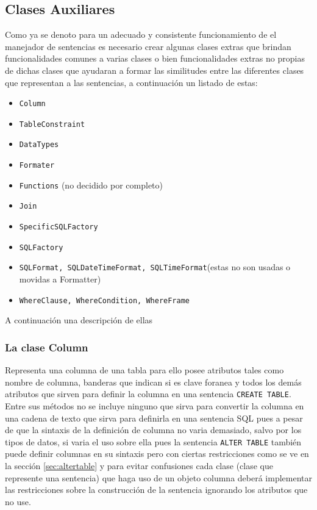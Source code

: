 \subsection{Clases Auxiliares} \label{seccion:disenio:clases-auxiliares}
Como ya se denoto para un adecuado y consistente funcionamiento de el manejador de sentencias es necesario crear algunas clases extras que brindan funcionalidades comunes a varias clases o bien funcionalidades extras no propias de dichas clases que ayudaran a formar las similitudes entre las diferentes clases que representan a las sentencias, a continuación un listado de estas:
%
\begin{itemize}
\item \verb=Column=
\item \verb=TableConstraint=
\item \verb=DataTypes=
\item \verb=Formater=
\item \verb=Functions= (no decidido por completo)
\item \verb=Join=
\item \verb=SpecificSQLFactory=
\item \verb=SQLFactory=
\item \verb=SQLFormat, SQLDateTimeFormat, SQLTimeFormat=(estas no son usadas o movidas a Formatter)
\item \verb=WhereClause, WhereCondition, WhereFrame=
\end{itemize}
A continuación una descripción de ellas
%
\subsubsection{La clase Column}
Representa una columna de una tabla para ello posee atributos tales como nombre de columna, banderas que indican si es clave foranea y todos los demás atributos que sirven para definir la columna en una sentencia \verb=CREATE TABLE=. Entre sus métodos no se incluye ninguno que sirva para convertir la columna en una cadena  de texto que sirva para definirla en una sentencia SQL pues a pesar de que la sintaxis de la definición de columna no varia demasiado, salvo por los tipos de datos, si varia el uso sobre ella pues la sentencia \verb=ALTER TABLE= también puede definir columnas en su sintaxis pero con ciertas restricciones como se ve en la sección \ref{sec:altertable} y para evitar confusiones cada clase (clase que represente una sentencia) que haga uso de un objeto columna deberá implementar las restricciones sobre la construcción de la sentencia ignorando los atributos que no use.


